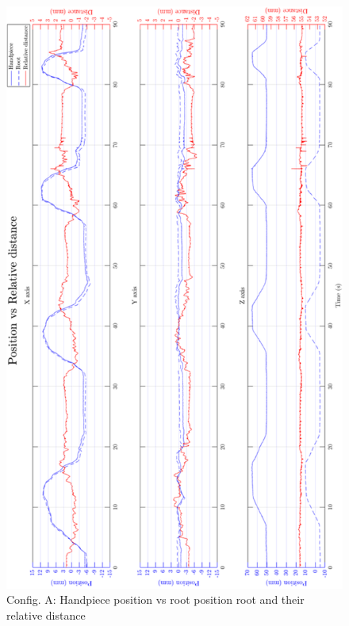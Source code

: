 \begin{figure}[htbp]
\begin{center}
\includegraphics[width=0.9\linewidth]{Images/exp/exp1_1_1.png}
\caption{Config. A: Handpiece position vs root position root and their relative distance}
\label{fig: exp1_1_1}
\end{center}
\end{figure}	
	
